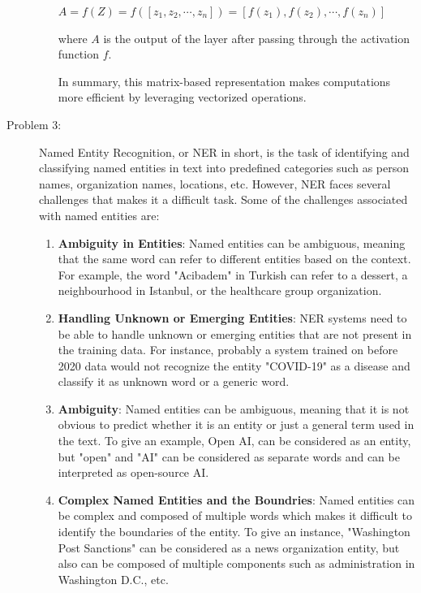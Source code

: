 \documentclass[12pt]{article}
\begin{document}
\begin{description}
\begin{enumerate}
    \begin{center}
      $\displaystyle{A = f(Z) = f([z_1, z_2, \cdots , z_n]) = [f(z_1), f(z_2), \cdots , f(z_n)]}$
    \end{center}

    where $A$ is the output of the layer after passing through the activation function $f$. 

    In summary, this matrix-based representation makes computations more efficient by leveraging vectorized operations.

  \end{enumerate}

  \pagebreak

  \item[Problem 3:] \hfill %
  
  Named Entity Recognition, or NER in short, is the task of identifying and classifying named entities in text into predefined categories such as person names, 
  organization names, locations, etc.
  However, NER faces several challenges that makes it a difficult task. Some of the challenges associated with named entities are:

  \begin{enumerate}
    \item \textbf{Ambiguity in Entities}: Named entities can be ambiguous, meaning that the same word can refer to different entities based on the context. 
    For example, the word "Acibadem" in Turkish can refer to a dessert, a neighbourhood in Istanbul, or the healthcare group organization.

    \item \textbf{Handling Unknown or Emerging Entities}: NER systems need to be able to handle unknown or emerging entities that are not present in the training data.
    For instance, probably a system trained on before 2020 data would not recognize the entity "COVID-19" as a disease and classify it as unknown word or a generic word. 

    \item \textbf{Ambiguity}: Named entities can be ambiguous, meaning that it is not obvious to predict whether it is an entity or just a general term used in the text.
    To give an example, Open AI, can be considered as an entity, but "open" and "AI" can be considered as separate words and can be interpreted as open-source AI.
    
    \item \textbf{Complex Named Entities and the Boundries}: Named entities can be complex and composed of multiple words which makes it difficult to identify the boundaries of the entity.
    To give an instance, "Washington Post Sanctions" can be considered as a news organization entity, but also can be composed of multiple components such as administration in Washington D.C., etc.
  \end{enumerate}


\end{description}
\end{document}
